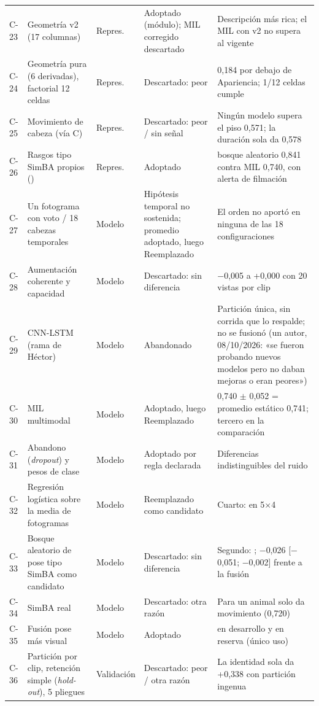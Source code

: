 \begin{longtable}{@{}p{}p{}p{}p{}p{}@{}}
C-23 & Geometría v2 (17 columnas) & Repres. & Adoptado (módulo); MIL corregido descartado & Descripción más rica; el MIL con v2 no supera al vigente \\
C-24 & Geometría pura (6 derivadas), factorial 12 celdas & Repres. & Descartado: peor & 0,184 por debajo de Apariencia; 1/12 celdas cumple \\
C-25 & Movimiento de cabeza (vía C) & Repres. & Descartado: peor / sin señal & Ningún modelo supera el piso 0,571; la duración sola da 0,578 \\
C-26 & Rasgos tipo SimBA propios (\PoseRasgos{}) & Repres. & Adoptado & bosque aleatorio 0,841 contra MIL 0,740, con alerta de filmación \\
C-27 & Un fotograma con voto / 18 cabezas temporales & Modelo & Hipótesis temporal no sostenida; promedio adoptado, luego Reemplazado & El orden no aportó en ninguna de las 18 configuraciones \\
C-28 & Aumentación coherente y capacidad & Modelo & Descartado: sin diferencia & \ensuremath{-}0,005 a +0,000 con 20 vistas por clip \\
C-29 & CNN-LSTM (rama de Héctor) & Modelo & Abandonado & Partición única, sin corrida que lo respalde; no se fusionó (un autor, 08/10/2026: «se fueron probando nuevos modelos pero no daban mejoras o eran peores») \\
C-30 & MIL multimodal & Modelo & Adoptado, luego Reemplazado & 0,740 \ensuremath{\pm} 0,052 = promedio estático 0,741; tercero en la comparación \\
C-31 & Abandono (\textit{dropout}) y pesos de clase & Modelo & Adoptado por regla declarada & Diferencias indistinguibles del ruido \\
C-32 & Regresión logística sobre la media de fotogramas & Modelo & Reemplazado como candidato & Cuarto: \BaseDevF{} en 5\ensuremath{\times}4 \\
C-33 & Bosque aleatorio de pose tipo SimBA como candidato & Modelo & Descartado: sin diferencia & Segundo: \RFPoseDevF{}; \ensuremath{-}0,026 [\ensuremath{-}0,051; \ensuremath{-}0,002] frente a la fusión \\
C-34 & SimBA real & Modelo & Descartado: otra razón & Para un animal solo da movimiento (0,720) \\
C-35 & Fusión pose más visual & Modelo & Adoptado & \FusionDevF{} en desarrollo y \FusionReservaF{} en reserva (único uso) \\
C-36 & Partición por clip, retención simple (\textit{hold-out}), 5 pliegues & Validación & Descartado: peor / otra razón & La identidad sola da +0,338 con partición ingenua \\

\end{longtable}
